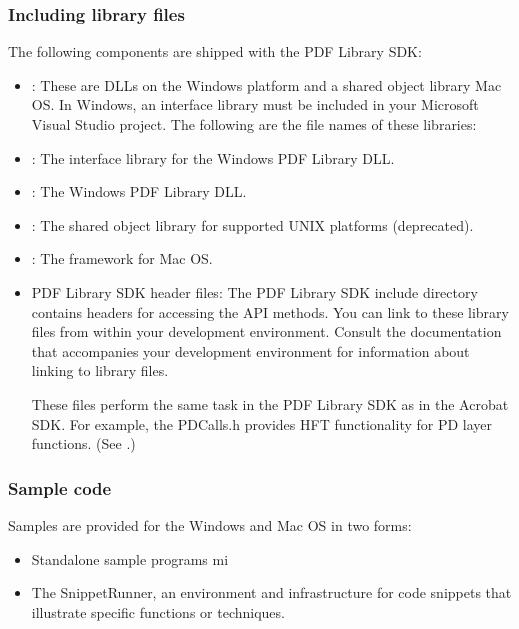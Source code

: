 \documentclass[letterpaper,12pt,english,openany,oneside]{sphinxmanual}
\begin{document}
\subsubsection{Including library files}
\label{\detokenize{Plugins_CreatingSimplePlug:including-library-files}}
The following components are shipped with the PDF Library SDK:
\begin{itemize}
\item {} 
: These are DLLs on the Windows platform and a shared object library Mac OS. In Windows, an interface library must be included in your Microsoft Visual Studio project. The following are the file names of these libraries:

\item {} 
: The interface library for the Windows PDF Library DLL.

\item {} 
: The Windows PDF Library DLL.

\item {} 
: The shared object library for supported UNIX platforms (deprecated).

\item {} 
: The framework for Mac OS.

\item {} 
PDF Library SDK header files: The PDF Library SDK include directory contains headers for accessing the API methods. You can link to these library files from within your development environment. Consult the documentation that accompanies your development environment for information about linking to library files.

These files perform the same task in the PDF Library SDK as in the Acrobat SDK. For example, the PDCalls.h provides HFT functionality for PD layer functions. (See .)

\end{itemize}


\subsubsection{Sample code}
\label{\detokenize{Plugins_CreatingSimplePlug:sample-code}}
Samples are provided for the Windows and Mac OS in two forms:
\begin{itemize}
\item {} 
Stand\sphinxhyphen{}alone sample programs\sphinxhyphen{}  mi

\item {} 
The SnippetRunner, an environment and infrastructure for code snippets that illustrate specific functions or techniques.

\end{itemize}
\end{document}
